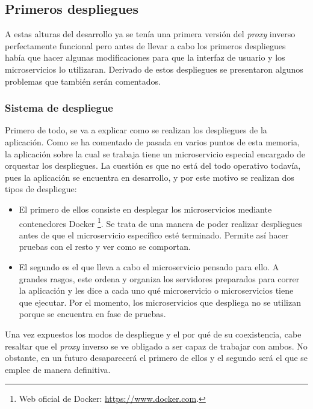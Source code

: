 \documentclass[11pt,spanish,listoffigures]{tfgetsinf}
\begin{document}
		\subsection{Primeros despliegues}

A estas alturas del desarrollo ya se tenía una primera versión del \emph{proxy} inverso perfectamente funcional pero antes de llevar a cabo los primeros despliegues había que hacer algunas modificaciones para que la interfaz de usuario y los microservicios lo utilizaran. Derivado de estos despliegues se presentaron algunos problemas que también serán comentados.


			\subsubsection{Sistema de despliegue}

Primero de todo, se va a explicar como se realizan los despliegues de la aplicación. Como se ha comentado de pasada en varios puntos de esta memoria, la aplicación sobre la cual se trabaja tiene un microservicio especial encargado de orquestar los despliegues. La cuestión es que no está del todo operativo todavía, pues la aplicación se encuentra en desarrollo, y por este motivo se realizan dos tipos de despliegue:

\begin{itemize}

	\item El primero de ellos consiste en desplegar los microservicios mediante contenedores Docker \footnote{Web oficial de Docker: \url{https://www.docker.com}.}. Se trata de una manera de poder realizar despliegues antes de que el microservicio específico esté terminado. Permite así hacer pruebas con el resto y ver como se comportan.

	\item El segundo es el que lleva a cabo el microservicio pensado para ello. A grandes rasgos, este ordena y organiza los servidores preparados para correr la aplicación y les dice a cada uno qué microservicio o microservicios tiene que ejecutar. Por el momento, los microservicios que despliega no se utilizan porque se encuentra en fase de pruebas.

\end{itemize}

Una vez expuestos los modos de despliegue y el por qué de su coexistencia, cabe resaltar que el \emph{proxy} inverso se ve obligado a ser capaz de trabajar con ambos. No obstante, en un futuro desaparecerá el primero de ellos y el segundo será el que se emplee de manera definitiva.
\end{document}
